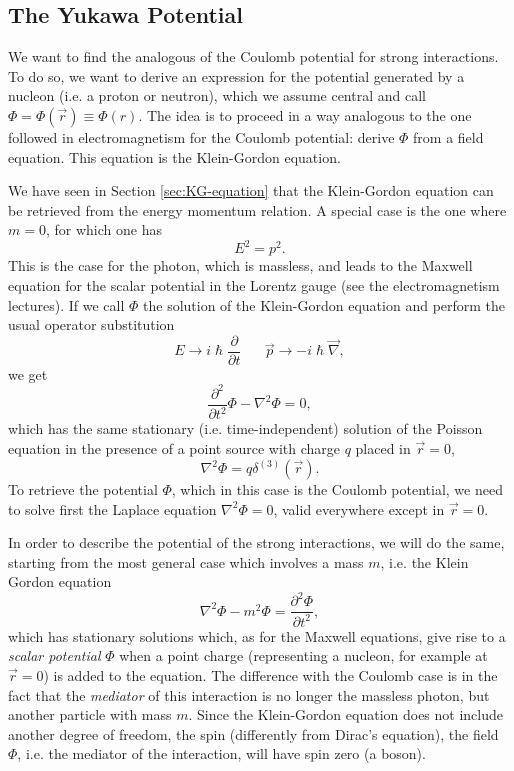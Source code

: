 \subsection{The Yukawa Potential}
We want to find the analogous of the Coulomb potential for strong interactions. To do so, we want to derive an expression for the potential generated by a nucleon (i.e. a proton or neutron), which we assume central and call \(\Phi=\Phi(\Vec{r})\equiv\Phi(r)\). The idea is to proceed in a way analogous to the one followed in electromagnetism for the Coulomb potential: derive \(\Phi\) from a field equation. This equation is the Klein-Gordon equation.

We have seen in Section \ref{sec:KG-equation} that the Klein-Gordon equation can be retrieved from the energy momentum relation. A special case is the one where $m = 0$, for which one has
\begin{equation}
    E^2 = p^2.
\end{equation}
This is the case for the photon, which is massless, and leads to the Maxwell equation for the scalar potential in the Lorentz gauge (see the electromagnetism lectures).
If we call \(\Phi\) the solution of the Klein-Gordon equation and perform the usual operator substitution
\begin{equation*}
    E\rightarrow i\hslash\frac{\partial}{\partial t} \;\;\;\;\;\; \Vec{p}\rightarrow-i\hslash\Vec{\nabla},
\end{equation*}
we get
\begin{equation*}
    \frac{\partial^2}{\partial t^2}\Phi - \nabla^2\Phi = 0,
\end{equation*}
which has the same stationary (i.e. time-independent) solution of the Poisson equation in the presence of a point source with charge $q$ placed in \(\Vec{r}=0\),
\begin{equation*}
    \nabla^{2} \Phi = q\delta^{(3)}(\Vec{r}).
\end{equation*}
To retrieve the potential $\Phi$, which in this case is the Coulomb potential, we need to solve first the Laplace equation $\nabla^2\Phi = 0$, valid everywhere except in $\Vec{r} = 0$.

In order to describe the potential of the strong interactions, we will do the same, starting from the most general case which involves a mass $m$, i.e. the Klein Gordon equation
\begin{equation*}
    \nabla^2\Phi - m^2\Phi = \frac{\partial^2\Phi}{\partial t^2},
\end{equation*}
which has stationary solutions which, as for the Maxwell equations, give rise to a \emph{scalar potential} $\Phi$ when a point charge (representing a nucleon, for example at \(\Vec{r}=0\)) is added to the equation. The difference with the Coulomb case is in the fact that the \emph{mediator} of this interaction is no longer the massless photon, but another particle with mass \(m\). Since the Klein-Gordon equation does not include another degree of freedom, the spin (differently from Dirac's equation), the field \(\Phi\), i.e. the mediator of the interaction, will have spin zero (a boson).

